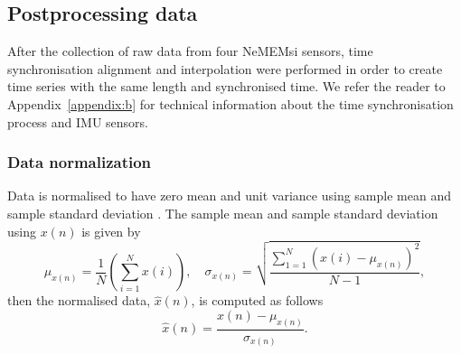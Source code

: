 \subsection{Postprocessing data}
After the collection of raw data from four NeMEMsi sensors,
time synchronisation alignment and interpolation were performed 
in order to create time series with the same length and synchronised time.
We refer the reader to Appendix~\ref{appendix:b} for technical information 
about the time synchronisation process and IMU sensors.



\subsubsection{Data normalization}

Data is normalised to have zero mean and unit variance 
using sample mean and sample standard deviation \cite{loffe2015}.
The sample mean and sample standard deviation using $x(n)$ is given by
\begin{equation}\label{eq:ms}
\mu_{x(n)}= \frac{1}{N} ( \sum_{i=1}^N x(i) ), \quad  \sigma_{x(n)} =  \sqrt{ \frac{  \sum_{1=1}^N ( x(i) - \mu_{x(n)} )^2 }{ N-1 }  },      
\end{equation}
then the normalised data, $\hat{x}(n)$, is computed as follows
\begin{equation}\label{eq:normalization}
\hat{x} (n) = \frac{   x(n) -  \mu_{x(n)}  }{   \sigma_{x(n)} }.   
\end{equation}



